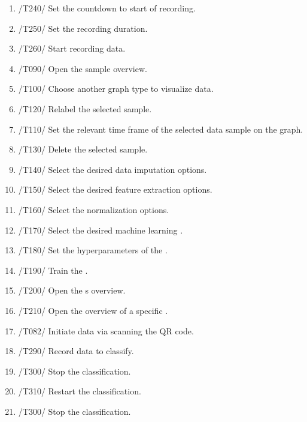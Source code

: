 \begin{enumerate}
    \item /T240/ Set the countdown to start of recording.
    \item /T250/ Set the recording duration.
    \item /T260/ Start recording data.
    \item /T090/ Open the sample overview.
    \item /T100/ Choose another graph type to visualize data.
    \item /T120/ Relabel the selected sample.
    \item /T110/ Set the relevant time frame of the selected \gls{data sample} on the graph.
    \item /T130/ Delete the selected sample.
    \item /T140/ Select the desired data imputation options.
    \item /T150/ Select the desired \gls{feature extraction} options.
    \item /T160/ Select the normalization options.
    \item /T170/ Select the desired machine learning .
    \item /T180/ Set the hyperparameters of the .
    \item /T190/ Train the .
    \item /T200/ Open the s overview. 
    \item /T210/ Open the overview of a specific .
    \item /T082/ Initiate data via scanning the \gls{QR code}.
    \item /T290/ Record data to classify. 
    \item /T300/ Stop the \gls{classification}.
    \item /T310/ Restart the \gls{classification}.
    \item /T300/ Stop the \gls{classification}.
\end{enumerate}

